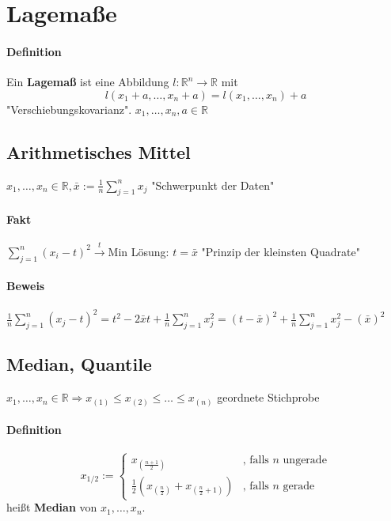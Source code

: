 \documentclass[a4paper,11pt,notitlepage]{report}
\newcommand{\R}{{\ensuremath{\mathbb{R}}}}
\begin{document}
\section{Lagemaße}
\paragraph{Definition}
Ein \textbf{Lagemaß} ist eine Abbildung $l \colon \R^n \rightarrow \R$ mit $$l(x_1+a,\ldots,x_n+a) = l(x_1,\ldots,x_n)+a$$ "Verschiebungskovarianz".
$x_1,\ldots,x_n,a \in \R$

\subsection{Arithmetisches Mittel}
$x_1,\ldots,x_n \in \R, \bar{x} := \frac{1}{n} \sum\limits_{j=1}^{n}{x_j}$ "Schwerpunkt der Daten"

\paragraph{Fakt}
$\sum\limits_{j=1}^{n}{(x_i - t)^2} \overset{t}{\rightarrow} \text{Min}$
\newline
Lösung: $t = \bar{x}$
\newline
"Prinzip der kleinsten Quadrate"

\paragraph{Beweis}
$\frac{1}{n} \sum\limits_{j=1}^{n}{(x_j - t)^2} = t^2 - 2\bar{x}t + \frac{1}{n} \sum\limits_{j=1}^{n}{x_j^2} = (t - \bar{x})^2 + \frac{1}{n} \sum\limits_{j=1}^{n}{x_j^2 - (\bar{x})^2}$

\subsection{Median, Quantile}
$x_1,\ldots,x_n \in \R \Rightarrow x_{(1)} \leq x_{(2)} \leq \ldots \leq x_{(n)}$ geordnete Stichprobe

\paragraph{Definition}

$$x_{1/2}:= \begin{cases}
	x_{(\frac{n+1}{2})} & \text{, falls } n \text{ ungerade} \\
	\frac{1}{2}(x_{(\frac{n}{2})} + x_{(\frac{n}{2}+1)}) & \text{, falls } n \text{ gerade}
\end{cases}
$$ 
heißt \textbf{Median} von $x_1,\ldots,x_n$.
\end{document}
